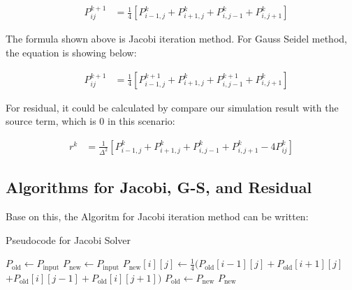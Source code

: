 \documentclass[12pt]{article}
\begin{document}
\begin{align*}
    \quad P_{ij}^{k+1} &= \frac{1}{4} \left[ P_{i-1,j}^k + P_{i+1,j}^k + P_{i,j-1}^k + P_{i,j+1}^k \right]
\end{align*}

The formula shown above is Jacobi iteration method.
For Gauss Seidel method, the equation is showing below:

\begin{align*}
    \quad P_{ij}^{k+1} &= \frac{1}{4} \left[ P_{i-1,j}^{k+1} + P_{i+1,j}^k + P_{i,j-1}^{k+1} + P_{i,j+1}^k \right]
\end{align*}

For residual, it could be calculated by compare our simulation result with
the source term, which is 0 in this scenario:

\begin{align*}
    r^k &= \frac{1}{\Delta^2} \left[ P_{i-1,j}^k + P_{i+1,j}^k + P_{i,j-1}^k + P_{i,j+1}^k - 4P_{ij}^k \right]
\end{align*}



\subsection{Algorithms for Jacobi, G-S, and Residual}
Base on this, the Algoritm for Jacobi iteration method can be written:

\begin{algorithm}
    \caption{Pseudocode for Jacobi Solver}
    \begin{algorithmic}[1]
        \State $P_{\text{old}} \gets P_{\text{input}}$
        \State $P_{\text{new}} \gets P_{\text{input}}$
                \State $P_{\text{new}}[i][j] \gets \frac{1}{4} (P_{\text{old}}[i-1][j] + P_{\text{old}}[i+1][j]$
                \Statex \hspace{\algorithmicindent}\hspace{\algorithmicindent}\hspace{\algorithmicindent}$+ P_{\text{old}}[i][j-1] + P_{\text{old}}[i][j+1])$
                \State $P_{\text{old}} \gets P_{\text{new}}$
            \EndFor
        \EndFor
        \State \Return $P_{\text{new}}$
        \EndFunction
    \end{algorithmic}
\end{algorithm}
\end{document}
